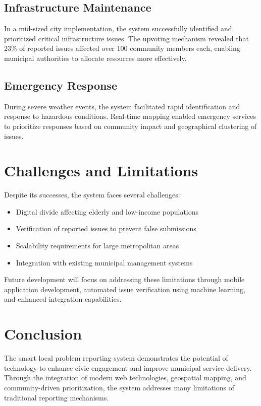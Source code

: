 \documentclass[journal,10pt,twocolumn]{IEEEtran}
\begin{document}
\subsection{Infrastructure Maintenance}
In a mid-sized city implementation, the system successfully identified and prioritized critical infrastructure issues. The upvoting mechanism revealed that 23\% of reported issues affected over 100 community members each, enabling municipal authorities to allocate resources more effectively.

\subsection{Emergency Response}
During severe weather events, the system facilitated rapid identification and response to hazardous conditions. Real-time mapping enabled emergency services to prioritize responses based on community impact and geographical clustering of issues.

\section{Challenges and Limitations}
Despite its successes, the system faces several challenges:

\begin{itemize}
\item Digital divide affecting elderly and low-income populations
\item Verification of reported issues to prevent false submissions
\item Scalability requirements for large metropolitan areas
\item Integration with existing municipal management systems
\end{itemize}

Future development will focus on addressing these limitations through mobile application development, automated issue verification using machine learning, and enhanced integration capabilities.

\section{Conclusion}
The smart local problem reporting system demonstrates the potential of technology to enhance civic engagement and improve municipal service delivery. Through the integration of modern web technologies, geospatial mapping, and community-driven prioritization, the system addresses many limitations of traditional reporting mechanisms.
\end{document}
